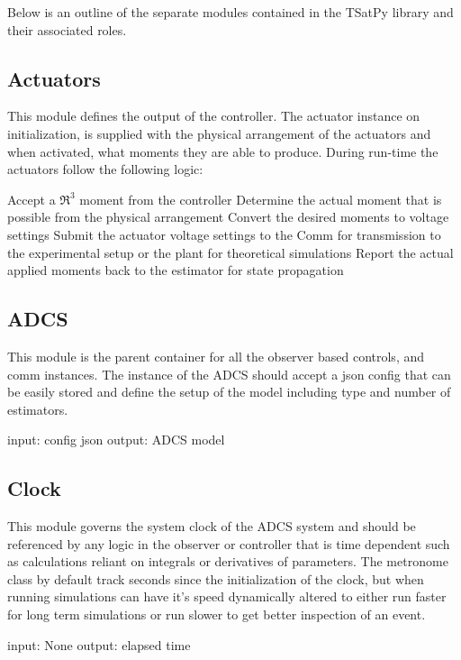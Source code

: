 Below is an outline of the separate modules contained in the TSatPy library and their associated roles.

\subsection{Actuators}
\label{subsec:actuators}

This module defines the output of the controller. The actuator instance on initialization, is supplied with the physical arrangement of the actuators and when activated, what moments they are able to produce. During run-time the actuators follow the following logic:

    Accept a $\Re^3$ moment from the controller
    Determine the actual moment that is possible from the physical arrangement
    Convert the desired moments to voltage settings
    Submit the actuator voltage settings to
        the Comm for transmission to the experimental setup or
        the plant for theoretical simulations
    Report the actual applied moments back to the estimator for state propagation

\subsection{ADCS}
\label{subsec:ADCS}


This module is the parent container for all the observer based controls, and comm instances. The instance of the ADCS should accept a json config that can be easily stored and define the setup of the model including type and number of estimators.

    input: config json
    output: ADCS model

\subsection{Clock}
\label{subsec:Clock}


This module governs the system clock of the ADCS system and should be referenced by any logic in the observer or controller that is time dependent such as calculations reliant on integrals or derivatives of parameters. The metronome class by default track seconds since the initialization of the clock, but when running simulations can have it's speed dynamically altered to either run faster for long term simulations or run slower to get better inspection of an event.

    input: None
    output: elapsed time

